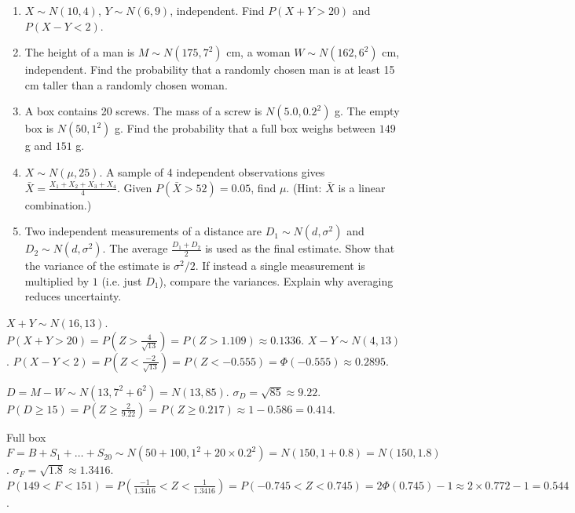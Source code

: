 \documentclass[11pt]{article}
\begin{document}
\begin{exercice}
\begin{enumerate}
    \item $X \sim N(10, 4)$, $Y \sim N(6, 9)$, independent. Find $P(X + Y > 20)$ and $P(X - Y < 2)$.
    \item The height of a man is $M \sim N(175, 7^2)$ cm, a woman $W \sim N(162, 6^2)$ cm, independent. Find the probability that a randomly chosen man is at least 15 cm taller than a randomly chosen woman.
    \item A box contains 20 screws. The mass of a screw is $N(5.0, 0.2^2)$ g. The empty box is $N(50, 1^2)$ g. Find the probability that a full box weighs between $149$ g and $151$ g.
    \item $X \sim N(\mu, 25)$. A sample of 4 independent observations gives $\bar{X} = \frac{X_1+X_2+X_3+X_4}{4}$. Given $P(\bar{X} > 52) = 0.05$, find $\mu$. (Hint: $\bar{X}$ is a linear combination.)
    \item Two independent measurements of a distance are $D_1 \sim N(d, \sigma^2)$ and $D_2 \sim N(d, \sigma^2)$. The average $\frac{D_1+D_2}{2}$ is used as the final estimate. Show that the variance of the estimate is $\sigma^2/2$. If instead a single measurement is multiplied by $1$ (i.e. just $D_1$), compare the variances. Explain why averaging reduces uncertainty.
\end{enumerate}
\end{exercice}

\begin{corrige}[Exercise 1]
$X+Y \sim N(16, 13)$. $P(X+Y>20) = P(Z > \frac{4}{\sqrt{13}}) = P(Z > 1.109) \approx 0.1336$.
$X-Y \sim N(4, 13)$. $P(X-Y<2) = P(Z < \frac{-2}{\sqrt{13}}) = P(Z < -0.555) = \Phi(-0.555) \approx 0.2895$.
\end{corrige}

\begin{corrige}[Exercise 2]
$D = M - W \sim N(13, 7^2+6^2) = N(13, 85)$. $\sigma_D = \sqrt{85} \approx 9.22$.
$P(D \ge 15) = P(Z \ge \frac{2}{9.22}) = P(Z \ge 0.217) \approx 1 - 0.586 = 0.414$.
\end{corrige}

\begin{corrige}[Exercise 3]
Full box $F = B + S_1+\dots+S_{20} \sim N(50+100, 1^2 + 20\times 0.2^2) = N(150, 1+0.8) = N(150, 1.8)$.
$\sigma_F = \sqrt{1.8} \approx 1.3416$.
$P(149 < F < 151) = P(\frac{-1}{1.3416} < Z < \frac{1}{1.3416}) = P(-0.745 < Z < 0.745) = 2\Phi(0.745)-1 \approx 2\times 0.772 - 1 = 0.544$.
\end{corrige}
\end{document}
